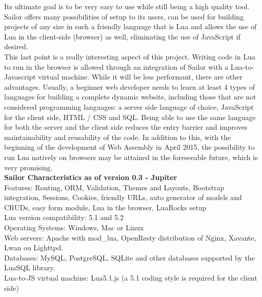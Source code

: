 \documentclass{article}
\begin{document}
Its ultimate goal is to be very easy to use while still being a high quality tool. Sailor offers many possibilities of setup to its users, can be used for building projects of any size in such a friendly language that is Lua and allows the use of Lua in the client-side (browser) as well, eliminating the use of JavaScript if desired.\\

This last point is a really interesting aspect of this project. Writing code in Lua to run in the browser is allowed through an integration of Sailor with a Lua-to-Javascript virtual machine. While it will be less performant, there are other advantages. Usually, a beginner web developer needs to learn at least 4 types of languages for building a complete dynamic website, including those that are not considered programming languages: a server side language of choice, JavaScript for the client side, HTML / CSS and SQL. Being able to use the same language for both the server and the client side reduces the entry barrier and improves maintainability and reusability of the code. In addition to this, with the beginning of the development of Web Assembly\autocite{webassembly} in April 2015, the possibility to run Lua natively on browsers may be attained in the foreseeable future, which is very promising.\\


\textbf{Sailor Characteristics as of version 0.3 - Jupiter}\\

Features: Routing, ORM, Validation, Themes and Layouts, Bootstrap integration, Sessions, Cookies, friendly URLs, auto generator of models and CRUDs, easy form module, Lua in the browser, LuaRocks setup\\

Lua version compatibility: 5.1 and 5.2\\

Operating Systems: Windows, Mac or Linux\\

Web servers: Apache with mod\_lua, OpenResty distribution of Nginx, Xavante, Lwan ou Lighttpd.\\

Databases: MySQL, PostgreSQL, SQLite and other databases supported by the LuaSQL library.\\

Lua-to-JS virtual machine: Lua5.1.js (a 5.1 coding style is required for the client side)\\
\end{document}
